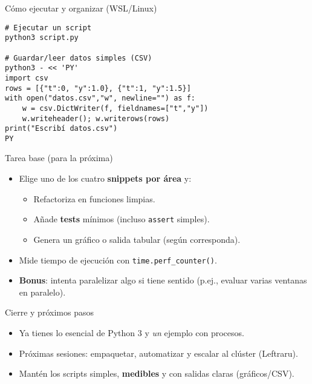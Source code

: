\documentclass[aspectratio=169,professionalfonts]{beamer}
\begin{document}
\begin{frame}[fragile]{Cómo ejecutar y organizar (WSL/Linux)}
\begin{verbatim}
# Ejecutar un script
python3 script.py

# Guardar/leer datos simples (CSV)
python3 - << 'PY'
import csv
rows = [{"t":0, "y":1.0}, {"t":1, "y":1.5}]
with open("datos.csv","w", newline="") as f:
    w = csv.DictWriter(f, fieldnames=["t","y"])
    w.writeheader(); w.writerows(rows)
print("Escribí datos.csv")
PY
\end{verbatim}
\end{frame}

\begin{frame}{Tarea base (para la próxima)}
\begin{itemize}
  \item Elige uno de los cuatro \textbf{snippets por área} y:
  \begin{itemize}
    \item Refactoriza en funciones limpias.
    \item Añade \textbf{tests} mínimos (incluso \texttt{assert} simples).
    \item Genera un gráfico o salida tabular (según corresponda).
  \end{itemize}
  \item Mide tiempo de ejecución con \texttt{time.perf\_counter()}.
  \item \textbf{Bonus}: intenta paralelizar algo si tiene sentido (p.ej., evaluar varias ventanas en paralelo).
\end{itemize}
\end{frame}

\begin{frame}{Cierre y próximos pasos}
\begin{itemize}
  \item Ya tienes lo esencial de Python 3 y \emph{un} ejemplo con procesos.
  \item Próximas sesiones: empaquetar, automatizar y escalar al clúster (Leftraru).
  \item Mantén los scripts simples, \textbf{medibles} y con salidas claras (gráficos/CSV).
\end{itemize}
\end{frame}
\end{document}
